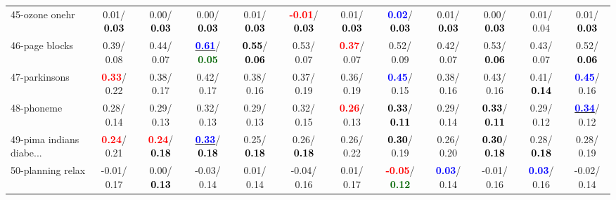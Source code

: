 \begin{table}[h]
\begin{center}
{\begin{tabular}{lc|c|c|c|c|c|c|c|c|c|c}
45-ozone onehr &   0.01/\textcolor{black}{\textbf{  0.03}} &   0.00/\textcolor{black}{\textbf{  0.03}} &   0.00/\textcolor{black}{\textbf{  0.03}} &   0.01/\textcolor{black}{\textbf{  0.03}} & \textcolor{red}{\textbf{ -0.01}}/\textcolor{black}{\textbf{  0.03}} &   0.01/\textcolor{black}{\textbf{  0.03}} & \textcolor{blue}{\textbf{  0.02}}/\textcolor{black}{\textbf{  0.03}} &   0.01/\textcolor{black}{\textbf{  0.03}} &   0.00/\textcolor{black}{\textbf{  0.03}} &   0.01/  0.04 &   0.01/\textcolor{black}{\textbf{  0.03}} \\
46-page blocks &   0.39/  0.08 &   0.44/  0.07 & \underline{\textcolor{blue}{\textbf{  0.61}}}/\textcolor{darkgreen}{\textbf{  0.05}} & \textcolor{black}{\textbf{  0.55}}/\textcolor{black}{\textbf{  0.06}} &   0.53/  0.07 & \textcolor{red}{\textbf{  0.37}}/  0.07 &   0.52/  0.09 &   0.42/  0.07 &   0.53/\textcolor{black}{\textbf{  0.06}} &   0.43/  0.07 &   0.52/\textcolor{black}{\textbf{  0.06}} \\ \hline
47-parkinsons & \textcolor{red}{\textbf{  0.33}}/  0.22 &   0.38/  0.17 &   0.42/  0.17 &   0.38/  0.16 &   0.37/  0.19 &   0.36/  0.19 & \textcolor{blue}{\textbf{  0.45}}/  0.15 &   0.38/  0.16 &   0.43/  0.16 &   0.41/\textcolor{black}{\textbf{  0.14}} & \textcolor{blue}{\textbf{  0.45}}/  0.16 \\
48-phoneme &   0.28/  0.14 &   0.29/  0.13 &   0.32/  0.13 &   0.29/  0.13 &   0.32/  0.15 & \textcolor{red}{\textbf{  0.26}}/  0.13 & \textcolor{black}{\textbf{  0.33}}/\textcolor{black}{\textbf{  0.11}} &   0.29/  0.14 & \textcolor{black}{\textbf{  0.33}}/\textcolor{black}{\textbf{  0.11}} &   0.29/  0.12 & \underline{\textcolor{blue}{\textbf{  0.34}}}/  0.12 \\
49-pima indians diabe... & \textcolor{red}{\textbf{  0.24}}/  0.21 & \textcolor{red}{\textbf{  0.24}}/\textcolor{black}{\textbf{  0.18}} & \underline{\textcolor{blue}{\textbf{  0.33}}}/\textcolor{black}{\textbf{  0.18}} &   0.25/\textcolor{black}{\textbf{  0.18}} &   0.26/\textcolor{black}{\textbf{  0.18}} &   0.26/  0.22 & \textcolor{black}{\textbf{  0.30}}/  0.19 &   0.26/  0.20 & \textcolor{black}{\textbf{  0.30}}/\textcolor{black}{\textbf{  0.18}} &   0.28/\textcolor{black}{\textbf{  0.18}} &   0.28/  0.19 \\
50-planning relax &  -0.01/  0.17 &   0.00/\textcolor{black}{\textbf{  0.13}} &  -0.03/  0.14 &   0.01/  0.14 &  -0.04/  0.16 &   0.01/  0.17 & \textcolor{red}{\textbf{ -0.05}}/\textcolor{darkgreen}{\textbf{  0.12}} & \textcolor{blue}{\textbf{  0.03}}/  0.14 &  -0.01/  0.16 & \textcolor{blue}{\textbf{  0.03}}/  0.16 &  -0.02/  0.14 \\

\end{tabular}}
\end{center}
\end{table}
